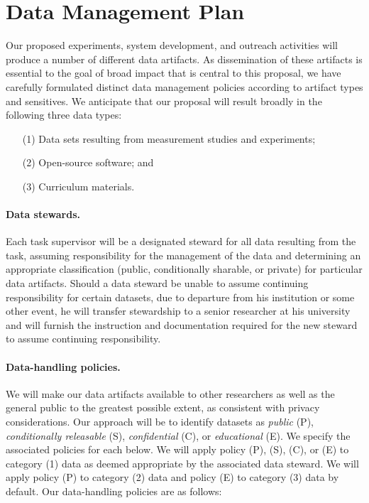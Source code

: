 \section*{Data Management Plan} 

Our proposed experiments, system development, and outreach activities will
produce a number of different data artifacts. As dissemination of these
artifacts is essential to the goal of broad impact that is central to this
proposal, we have carefully formulated distinct data management policies
according to artifact types and sensitives. We anticipate that our proposal
will result broadly in the following three data types:

\begin{enumerate}
\item[(1)] Data sets resulting from measurement studies and experiments;
\item[(2)] Open-source software; and
\item[(3)] Curriculum materials.
\end{enumerate}

\paragraph{Data stewards.} Each task supervisor will be a designated steward for
all data resulting from the task, assuming responsibility for the management of
the data and determining an appropriate classification (public, conditionally
sharable, or private) for particular data artifacts. Should a data steward be
unable to assume continuing responsibility for certain datasets, due to
departure from his institution or some other event, he will transfer stewardship
to a senior researcher at his university and
will furnish the instruction and documentation required for the new steward to
assume continuing responsibility.

\paragraph{Data-handling policies.} We will make our data artifacts available to
other researchers as well as the general public to the greatest possible extent,
as consistent with privacy considerations. Our approach will be to identify
datasets as {\em public} (P), {\em conditionally releasable} (S), {\em
confidential} (C), or {\em educational} (E). We specify the associated policies
for each below. We will apply policy (P), (S), (C), or (E) to category (1) data
as deemed appropriate by the associated data steward. We will apply policy (P)
to category (2) data and policy (E) to category (3) data by default. Our
data-handling policies are as follows:

